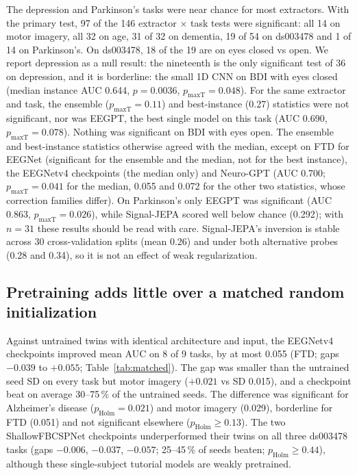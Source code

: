 \documentclass[11pt]{article}
\begin{document}
The depression and Parkinson's tasks were near chance for most extractors. With the primary test,
97 of the 146 extractor $\times$ task tests were significant: all 14 on motor imagery, all 32 on
age, 31 of 32 on dementia, 19 of 54 on ds003478 and 1 of 14 on Parkinson's. On ds003478, 18 of
the 19 are on eyes closed vs open. We report depression as a null result: the nineteenth is the
only significant test of 36 on depression, and it is borderline: the small 1D CNN on BDI with eyes closed (median instance AUC 0.644, $p = 0.0036$,
$p_\text{maxT} = 0.048$). For the same extractor and task, the ensemble ($p_\text{maxT} = 0.11$)
and best-instance (0.27) statistics were not significant, nor was EEGPT, the best single model on
this task (AUC 0.690, $p_\text{maxT} = 0.078$). Nothing was significant on BDI with eyes open. The
ensemble and best-instance statistics otherwise agreed with the median, except on FTD for EEGNet
(significant for the ensemble and the median, not for the best instance), the EEGNetv4 checkpoints
(the median only) and Neuro-GPT (AUC 0.700; $p_\text{maxT} = 0.041$ for the median, 0.055 and 0.072
for the other two statistics, whose correction families differ). On Parkinson's only EEGPT was significant (AUC 0.863, $p_\text{maxT} = 0.026$), while
Signal-JEPA scored well below chance (0.292); with $n = 31$ these results should be read with care.
Signal-JEPA's inversion is stable across 30 cross-validation splits (mean 0.26) and under both
alternative probes (0.28 and 0.34), so it is not an effect of weak regularization.

\subsection{Pretraining adds little over a matched random initialization}
Against untrained twins with identical architecture and input, the EEGNetv4 checkpoints improved
mean AUC on 8 of 9 tasks, by at most 0.055 (FTD; gaps $-0.039$ to $+0.055$; Table~\ref{tab:matched}).
The gap was smaller than the untrained seed SD on every task but motor imagery ($+0.021$ vs SD
0.015), and a checkpoint beat on average 30--75\,\% of the untrained seeds. The difference was
significant for Alzheimer's disease ($p_\text{Holm} = 0.021$) and motor imagery (0.029), borderline
for FTD (0.051) and not significant elsewhere ($p_\text{Holm} \ge 0.13$). The two ShallowFBCSPNet
checkpoints underperformed their twins on all three ds003478 tasks (gaps $-0.006$, $-0.037$,
$-0.057$; 25--45\,\% of seeds beaten; $p_\text{Holm} \ge 0.44$), although these single-subject tutorial
models are weakly pretrained.
\end{document}
